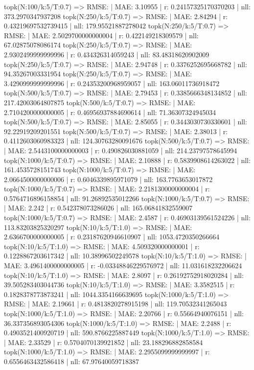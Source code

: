 topk(N:100/k:5/T:0.7) => RMSE: | MAE: 3.10955 | r: 0.24157325170370203 | nll: 373.2970347937208
topk(N:250/k:5/T:0.7) => RMSE: | MAE: 2.84294 | r: 0.43219697532739415 | nll: 179.95521887278042
topk(N:250/k:5/T:0.7) => RMSE: | MAE: 2.5029700000000004 | r: 0.422149218309579 | nll: 67.02875078086174
topk(N:250/k:5/T:0.7) => RMSE: | MAE: 2.9302499999999996 | r: 0.434326314059243 | nll: 83.48318620902009
topk(N:250/k:5/T:0.7) => RMSE: | MAE: 2.94748 | r: 0.3376252695668782 | nll: 94.35267003331954
topk(N:250/k:5/T:0.7) => RMSE: | MAE: 3.4290999999999996 | r: 0.24353200968959057 | nll: 163.06011736918472
topk(N:500/k:5/T:0.7) => RMSE: | MAE: 2.79453 | r: 0.3385666348134852 | nll: 217.42003064807875
topk(N:500/k:5/T:0.7) => RMSE: | MAE: 2.7104200000000005 | r: 0.46956937884690614 | nll: 71.36307324945034
topk(N:500/k:5/T:0.7) => RMSE: | MAE: 2.85055 | r: 0.3443030730330601 | nll: 92.22919209201551
topk(N:500/k:5/T:0.7) => RMSE: | MAE: 2.38013 | r: 0.4112603060983323 | nll: 124.30763280091676
topk(N:500/k:5/T:0.7) => RMSE: | MAE: 2.5443100000000003 | r: 0.490826030881059 | nll: 214.23797578645994
topk(N:1000/k:5/T:0.7) => RMSE: | MAE: 2.10888 | r: 0.5839908614263022 | nll: 161.4535728151743
topk(N:1000/k:5/T:0.7) => RMSE: | MAE: 2.0664500000000006 | r: 0.6046339895971079 | nll: 163.7763653017872
topk(N:1000/k:5/T:0.7) => RMSE: | MAE: 2.2181300000000004 | r: 0.5764716896158854 | nll: 91.26892535012266
topk(N:1000/k:5/T:0.7) => RMSE: | MAE: 2.242 | r: 0.542378073286026 | nll: 165.06841832559007
topk(N:1000/k:5/T:0.7) => RMSE: | MAE: 2.4587 | r: 0.46903139561524226 | nll: 113.83203825320297
topk(N:10/k:5/T:1.0) => RMSE: | MAE: 2.6366700000000005 | r: 0.23187620946610907 | nll: 1053.4720350266664
topk(N:10/k:5/T:1.0) => RMSE: | MAE: 4.509320000000001 | r: 0.1228867203617342 | nll: 10.38996502249578
topk(N:10/k:5/T:1.0) => RMSE: | MAE: 3.4961400000000005 | r: -0.03348846229576972 | nll: 11.031618232206624
topk(N:10/k:5/T:1.0) => RMSE: | MAE: 2.8097 | r: 0.26192752918020284 | nll: 39.505283403044736
topk(N:10/k:5/T:1.0) => RMSE: | MAE: 3.3582515 | r: 0.1828378773873241 | nll: 1044.3354166639695
topk(N:1000/k:5/T:1.0) => RMSE: | MAE: 2.19661 | r: 0.4813820278915198 | nll: 119.70532341265043
topk(N:1000/k:5/T:1.0) => RMSE: | MAE: 2.20766 | r: 0.55664940076151 | nll: 36.337356893054306
topk(N:1000/k:5/T:1.0) => RMSE: | MAE: 2.2488 | r: 0.4903521400920719 | nll: 590.8766225887449
topk(N:1000/k:5/T:1.0) => RMSE: | MAE: 2.33529 | r: 0.5704070139921852 | nll: 23.188296882858584
topk(N:1000/k:5/T:1.0) => RMSE: | MAE: 2.2955099999999997 | r: 0.6556463432586418 | nll: 67.97640059718387
